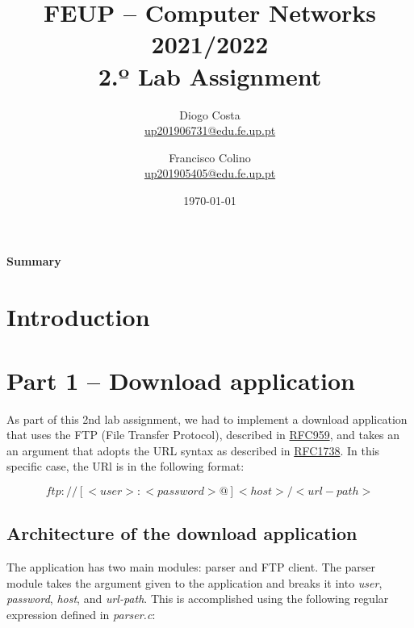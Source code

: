 \documentclass[a4paper,11pt,english]{article}
\begin{document}

\author{
    Diogo Costa\\
    \href{mailto:up201906731@edu.fe.up.pt}{up201906731@edu.fe.up.pt}
    \and
    Francisco Colino\\
    \href{mailto:up201905405@edu.fe.up.pt}{up201905405@edu.fe.up.pt}
}
\title{FEUP -- Computer Networks \large 2021/2022 \\ \large 2.º Lab Assignment}
\date{\today}
\maketitle

\begin{center}
    \textbf{Summary}
\end{center}

    


\section{Introduction}


\section{Part 1 -- Download application}
    As part of this 2nd lab assignment, we had to implement a download application that uses
    the FTP (File Transfer Protocol), described in \href{https://www.rfc-editor.org/info/rfc959}{RFC959},
    and takes an an argument that adopts the URL syntax as described in
    \href{https://www.rfc-editor.org/info/rfc1738}{RFC1738}. In this specific case, the URl is in the
    following format:
    
    $$ ftp://[<user>:<password>@]<host>/<url-path> $$
    

    \subsection{Architecture of the download application}
        The application has two main modules: parser and FTP client.
        The parser module takes the argument given to the application and breaks it into
        \textit{user}, \textit{password}, \textit{host}, and \textit{url-path}.
        This is accomplished using the following regular expression defined in \textit{parser.c}:
\end{document}

